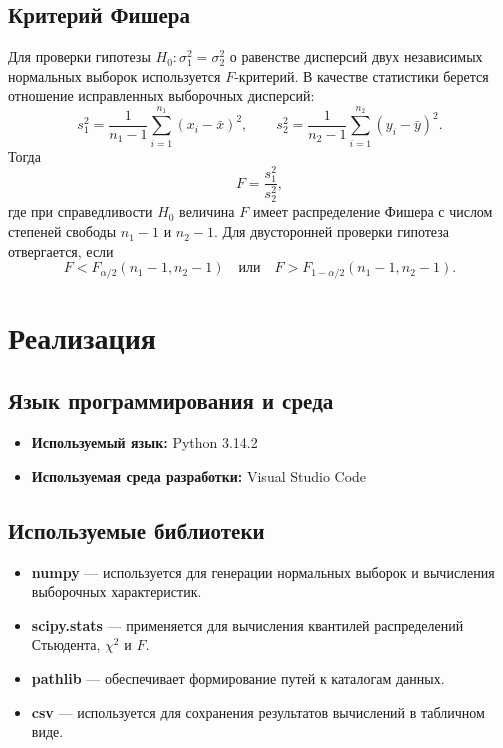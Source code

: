\documentclass[a4paper, 14pt]{extarticle}
\begin{document}
\subsection{Критерий Фишера}

Для проверки гипотезы $H_0: \sigma_1^2 = \sigma_2^2$ о равенстве дисперсий двух независимых нормальных выборок используется $F$-критерий. В качестве статистики берется отношение исправленных выборочных дисперсий:
\begin{equation*}
    s_1^2 = \frac{1}{n_1 - 1} \sum_{i=1}^{n_1} (x_i - \bar{x})^2, \qquad
    s_2^2 = \frac{1}{n_2 - 1} \sum_{i=1}^{n_2} (y_i - \bar{y})^2.
\end{equation*}
Тогда
\begin{equation*}
    F = \frac{s_1^2}{s_2^2},
\end{equation*}
где при справедливости $H_0$ величина $F$ имеет распределение Фишера с числом степеней свободы $n_1-1$ и $n_2-1$. Для двусторонней проверки гипотеза отвергается, если
\begin{equation*}
    F < F_{\alpha/2}(n_1-1, n_2-1) \quad \text{или} \quad F > F_{1-\alpha/2}(n_1-1, n_2-1).
\end{equation*}

\section{Реализация}

\subsection{Язык программирования и среда}
\begin{itemize}
    \item \textbf{Используемый язык:} Python 3.14.2
    \item \textbf{Используемая среда разработки:} Visual Studio Code
\end{itemize}

\subsection{Используемые библиотеки}
\begin{itemize}
    \item \textbf{numpy} --- используется для генерации нормальных выборок и вычисления выборочных характеристик.
    \item \textbf{scipy.stats} --- применяется для вычисления квантилей распределений Стьюдента, $\chi^2$ и $F$.
    \item \textbf{pathlib} --- обеспечивает формирование путей к каталогам данных.
    \item \textbf{csv} --- используется для сохранения результатов вычислений в табличном виде.
\end{itemize}
\end{document}
